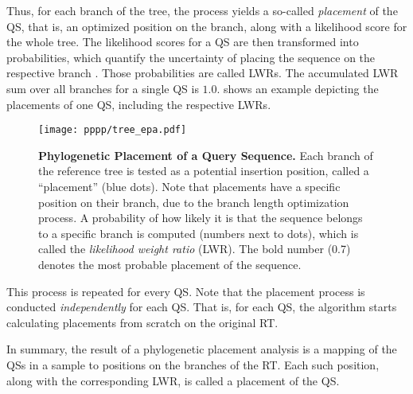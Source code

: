 Thus, for each branch of the tree, the process yields a so-called \emph{placement} of the \ac{QS},
that is, an optimized position on the branch, along with a likelihood score for the whole tree.
The likelihood scores for a \ac{QS} are then transformed into probabilities,
which quantify the uncertainty of placing the sequence on the respective branch \cite{Strimmer2002,VonMering2007}.
Those probabilities are called \acp{LWR}.
The accumulated \ac{LWR} sum over all branches for a single \ac{QS} is $1.0$.
 shows an example depicting the placements of one \ac{QS}, including the respective \acp{LWR}.

\begin{figure}[hpbt]
    \centering
    \texttt{[image: pppp/tree\_epa.pdf]}
    \caption[Phylogenetic Placement of a Query Sequence]{
        \textbf{Phylogenetic Placement of a Query Sequence.}
        Each branch of the reference tree is tested as a potential insertion position, called a ``placement'' (blue dots).
        Note that placements have a specific position on their branch, due to the branch length optimization process.
        A probability of how likely it is that the sequence belongs to a specific branch is computed
        (numbers next to dots),
        which is called the \emph{likelihood weight ratio} (LWR).
        The bold number (0.7) denotes the most probable placement of the sequence.
    }
    \label{fig:tree_epa}
\end{figure}

This process is repeated for every \ac{QS}.
Note that the placement process is conducted {\em independently} for each \ac{QS}.
That is, for each \ac{QS}, the algorithm starts calculating placements from scratch on the original \ac{RT}.

In summary, the result of a phylogenetic placement analysis is a mapping of the \acp{QS} in a sample
to positions on the branches of the \ac{RT}.
Each such position, along with the corresponding \ac{LWR}, is called a placement of the \ac{QS}.

